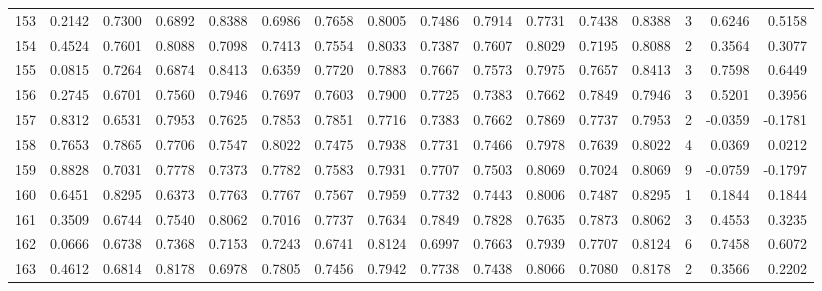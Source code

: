 \begin{tabular}{lrrrrrrrrrrrrrrr}
153 &      0.2142 &  0.7300 &  0.6892 &  0.8388 &  0.6986 &  0.7658 &  0.8005 &  0.7486 &  0.7914 &  0.7731 &   0.7438 &     0.8388 &      3 &                    0.6246 &                     0.5158 \\
154 &      0.4524 &  0.7601 &  0.8088 &  0.7098 &  0.7413 &  0.7554 &  0.8033 &  0.7387 &  0.7607 &  0.8029 &   0.7195 &     0.8088 &      2 &                    0.3564 &                     0.3077 \\
155 &      0.0815 &  0.7264 &  0.6874 &  0.8413 &  0.6359 &  0.7720 &  0.7883 &  0.7667 &  0.7573 &  0.7975 &   0.7657 &     0.8413 &      3 &                    0.7598 &                     0.6449 \\
156 &      0.2745 &  0.6701 &  0.7560 &  0.7946 &  0.7697 &  0.7603 &  0.7900 &  0.7725 &  0.7383 &  0.7662 &   0.7849 &     0.7946 &      3 &                    0.5201 &                     0.3956 \\
157 &      0.8312 &  0.6531 &  0.7953 &  0.7625 &  0.7853 &  0.7851 &  0.7716 &  0.7383 &  0.7662 &  0.7869 &   0.7737 &     0.7953 &      2 &                   -0.0359 &                    -0.1781 \\
158 &      0.7653 &  0.7865 &  0.7706 &  0.7547 &  0.8022 &  0.7475 &  0.7938 &  0.7731 &  0.7466 &  0.7978 &   0.7639 &     0.8022 &      4 &                    0.0369 &                     0.0212 \\
159 &      0.8828 &  0.7031 &  0.7778 &  0.7373 &  0.7782 &  0.7583 &  0.7931 &  0.7707 &  0.7503 &  0.8069 &   0.7024 &     0.8069 &      9 &                   -0.0759 &                    -0.1797 \\
160 &      0.6451 &  0.8295 &  0.6373 &  0.7763 &  0.7767 &  0.7567 &  0.7959 &  0.7732 &  0.7443 &  0.8006 &   0.7487 &     0.8295 &      1 &                    0.1844 &                     0.1844 \\
161 &      0.3509 &  0.6744 &  0.7540 &  0.8062 &  0.7016 &  0.7737 &  0.7634 &  0.7849 &  0.7828 &  0.7635 &   0.7873 &     0.8062 &      3 &                    0.4553 &                     0.3235 \\
162 &      0.0666 &  0.6738 &  0.7368 &  0.7153 &  0.7243 &  0.6741 &  0.8124 &  0.6997 &  0.7663 &  0.7939 &   0.7707 &     0.8124 &      6 &                    0.7458 &                     0.6072 \\
163 &      0.4612 &  0.6814 &  0.8178 &  0.6978 &  0.7805 &  0.7456 &  0.7942 &  0.7738 &  0.7438 &  0.8066 &   0.7080 &     0.8178 &      2 &                    0.3566 &                     0.2202 \\

\end{tabular}
